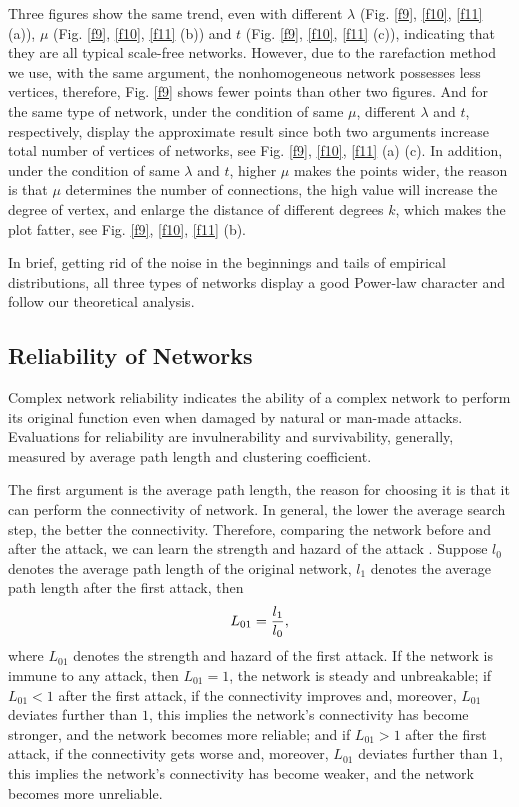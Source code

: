 \documentclass[final]{IEEEtran}
\begin{document}
Three figures show the same trend, even with different $\lambda$
(Fig. \ref{f9}, \ref{f10}, \ref{f11} (a)), $\mu$ (Fig. \ref{f9},
\ref{f10}, \ref{f11} (b)) and $t$ (Fig. \ref{f9}, \ref{f10},
\ref{f11} (c)), indicating that they are all typical scale-free
networks. However, due to the rarefaction method we use, with the
same argument, the nonhomogeneous network possesses less vertices,
therefore, Fig. \ref{f9} shows fewer points than other two
figures. And for the same type of network, under the condition of
same $\mu$, different $\lambda$ and $t$, respectively, display the
approximate result since both two arguments increase total number
of vertices of networks, see Fig. \ref{f9}, \ref{f10}, \ref{f11}
(a) (c). In addition, under the condition of same $\lambda$ and
$t$, higher $\mu$ makes the points wider, the reason is that $\mu$
determines the number of connections, the high value will increase
the degree of vertex, and enlarge the distance of different
degrees $k$, which makes the plot fatter, see Fig. \ref{f9},
\ref{f10}, \ref{f11} (b).


In brief, getting rid of the noise in the beginnings and tails of
empirical distributions, all three types of networks display a
good Power-law character and follow our theoretical analysis.


\subsection{Reliability of Networks }
Complex network reliability indicates the ability of a complex
network to perform its original function even when damaged by
natural or man-made attacks. Evaluations for reliability are
invulnerability and survivability, generally, measured by average
path length and clustering coefficient.


The first argument is the average path length, the reason for
choosing it is that it can perform the connectivity of network. In
general, the lower the average search step, the better the
connectivity. Therefore, comparing the network before and after
the attack, we can learn the strength and hazard of the attack
\cite{feng}. Suppose $l_{0}$ denotes the average path length of
the original network, $l_{1}$ denotes the average path length
after the first attack, then
\begin{equation}\label{e49}\footnotesize
L_{01}=\frac{l_{1}}{l_{0}},
\end{equation}
where $L_{01}$ denotes the strength and hazard of the first
attack. If the network is immune to any attack, then
$L_{01}$$=$$1$, the network is steady and unbreakable; if
$L_{01}$$<$$1$ after the first attack, if the connectivity
improves and, moreover, $L_{01}$ deviates further than $1$, this
implies the network's connectivity has become stronger, and the
network becomes more reliable; and if $L_{01}$$>$$1$ after the
first attack, if the connectivity gets worse and, moreover,
$L_{01}$ deviates further than $1$, this implies the network's
connectivity has become weaker, and the network becomes more
unreliable.
\end{document}
